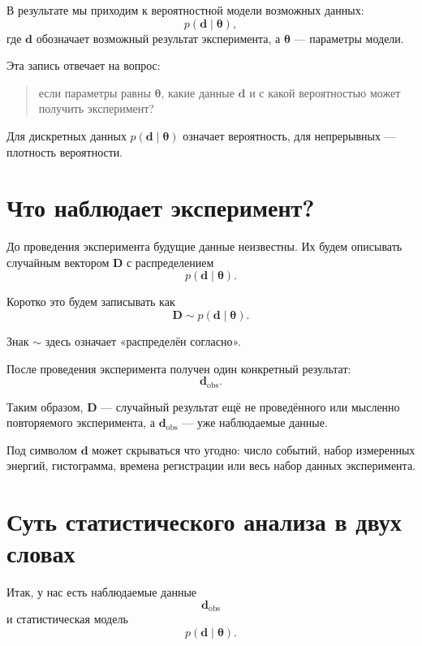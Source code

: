 \documentclass[
  russian,
  11pt,
  a4paper,
  open=any]{scrbook}
\begin{document}
В результате мы приходим к вероятностной модели возможных данных: \[
p(\mathbf d\mid\boldsymbol{\theta}),
\] где \(\mathbf d\) обозначает возможный результат эксперимента, а
\(\boldsymbol{\theta}\) --- параметры модели.

Эта запись отвечает на вопрос:

\begin{quote}
если параметры равны \(\boldsymbol{\theta}\), какие данные \(\mathbf d\)
и с какой вероятностью может получить эксперимент?
\end{quote}

Для дискретных данных \(p(\mathbf d\mid\boldsymbol{\theta})\) означает
вероятность, для непрерывных --- плотность вероятности.

\section{Что наблюдает
эксперимент?}\label{ux447ux442ux43e-ux43dux430ux431ux43bux44eux434ux430ux435ux442-ux44dux43aux441ux43fux435ux440ux438ux43cux435ux43dux442}

До проведения эксперимента будущие данные неизвестны. Их будем описывать
случайным вектором \(\mathbf D\) с распределением \[
p(\mathbf d\mid\boldsymbol{\theta}).
\]

Коротко это будем записывать как \[
\mathbf D\sim p(\mathbf d\mid\boldsymbol{\theta}).
\]

Знак \(\sim\) здесь означает «распределён согласно».

После проведения эксперимента получен один конкретный результат: \[
\mathbf d_{\mathrm{obs}}.
\]

Таким образом, \(\mathbf D\) --- случайный результат ещё не проведённого
или мысленно повторяемого эксперимента, а \(\mathbf d_{\mathrm{obs}}\)
--- уже наблюдаемые данные.

Под символом \(\mathbf d\) может скрываться что угодно: число событий,
набор измеренных энергий, гистограмма, времена регистрации или весь
набор данных эксперимента.

\section{Суть статистического анализа в двух
словах}\label{ux441ux443ux442ux44c-ux441ux442ux430ux442ux438ux441ux442ux438ux447ux435ux441ux43aux43eux433ux43e-ux430ux43dux430ux43bux438ux437ux430-ux432-ux434ux432ux443ux445-ux441ux43bux43eux432ux430ux445}

Итак, у нас есть наблюдаемые данные \[
\mathbf d_{\mathrm{obs}}
\] и статистическая модель \[
p(\mathbf d\mid\boldsymbol{\theta}).
\]
\end{document}
